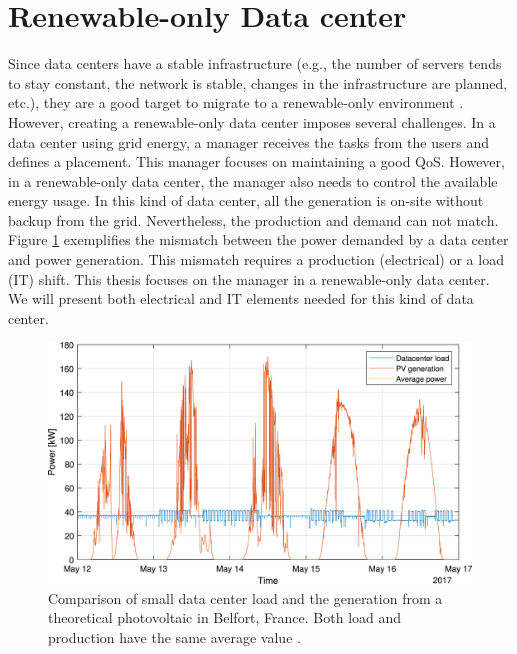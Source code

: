 \section{Renewable-only Data center}
Since data centers have a stable infrastructure (e.g., the number of servers tends to stay constant, the network is stable, changes in the infrastructure are planned, etc.), they are a good target to migrate to a renewable-only environment \cite{rostirolla2022survey}. However, creating a renewable-only data center imposes several challenges. In a data center using grid energy, a manager receives the tasks from the users and defines a placement. This manager focuses on maintaining a good QoS. However, in a renewable-only data center, the manager also needs to control the available energy usage. In this kind of data center, all the generation is on-site without backup from the grid. Nevertheless, the production and demand can not match. Figure \ref{fig:load_production} exemplifies the mismatch between the power demanded by a data center and power generation. This mismatch requires a production (electrical) or a load (IT) shift. This thesis focuses on the manager in a renewable-only data center. We will present both electrical and IT elements needed for this kind of data center.

\begin{figure}[!htb]
    \centering
    \includegraphics[scale=1]{Images/Related_works/load_production.jpg}
    \caption[Comparison of small data center load and the generation from a theoretical photovoltaic in Belfort, France. Both load and production have the same average value.]{Comparison of small data center load and the generation from a theoretical photovoltaic in Belfort, France. Both load and production have the same average value \cite{rostirolla2022survey}.}
    \label{fig:load_production}
\end{figure}

